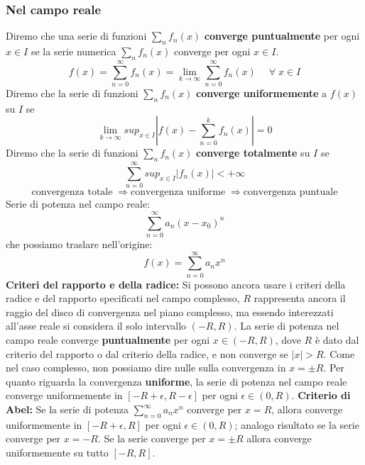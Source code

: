 \subsubsection*{Nel campo reale}
Diremo che una serie di funzioni $\sum_{n}f_n(x)$ \textbf{converge puntualmente} per ogni $x \in I$ se la serie numerica $\sum_{n}f_n(x)$ converge per ogni $x \in I$.
\[
    f(x) = \sum_{n=0}^{\infty} f_n(x) = \lim_{k\rightarrow \infty} \sum_{n=0}^{\infty} f_n(x) \quad \;\forall\;x \in I
\]
\newline
Diremo che la serie di funzioni $\sum_{n}f_n(x)$ \textbf{converge uniformemente} a $f(x)$ su $I$ se
\[
    \lim_{k\rightarrow \infty} sup_{x \in I}\left| f(x) - \sum_{n=0}^{k}f_n(x) \right| = 0
\]
\newline
Diremo che la serie di funzioni $\sum_{n}f_n(x)$ \textbf{converge totalmente} su $I$ se
\[
    \sum_{n=0}^{\infty} sup_{x \in I}\left| f_n(x) \right| < + \infty
\]
\newline
\[
    \text{convergenza totale}\; \Longrightarrow \text{convergenza uniforme}\; \Longrightarrow \text{convergenza puntuale}
\]
\newline
Serie di potenza nel campo reale:
\[
    \sum_{n=0}^{\infty} a_n(x-x_0)^n
\]
che possiamo traslare nell'origine:
\[
    f(x) = \sum_{n=0}^{\infty} a_n x^n
\]
\newline
\textbf{Criteri del rapporto e della radice:} Si possono ancora usare i criteri della radice e del rapporto specificati nel campo complesso, $R$ rappresenta ancora il raggio del disco di convergenza nel piano complesso, ma essendo interezzati all'asse reale si considera il solo intervallo $(-R, R)$.\newline
La serie di potenza nel campo reale converge \textbf{puntualmente} per ogni $x \in (-R, R)$, dove $R$ è dato dal criterio del rapporto o dal criterio della radice, e non converge se $|x| > R$.\newline
Come nel caso complesso, non possiamo dire nulle sulla convergenza in $x = \pm R$.\newline
Per quanto riguarda la convergenza \textbf{uniforme}, la serie di potenza nel campo reale converge uniformemente in $[-R+\epsilon, R- \epsilon]$ per ogni $\epsilon \in (0,R)$.\newline
\newline
\textbf{Criterio di Abel:} Se la serie di potenza $\sum_{n=0}^{\infty} a_n x^n$ converge per $x = R$, allora converge uniformemente in $[-R + \epsilon, R]$ per ogni $\epsilon \in (0,R)$; analogo risultato se la serie converge per $x = -R$. Se la serie converge per $x = \pm R$ allora converge uniformemente su tutto $[-R, R]$.\newline
